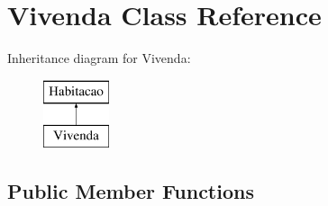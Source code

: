 \hypertarget{class_vivenda}{}\section{Vivenda Class Reference}
\label{class_vivenda}
Inheritance diagram for Vivenda\+:\begin{figure}[H]
\begin{center}
\leavevmode
\includegraphics[height=2.000000cm]{class_vivenda}
\end{center}
\end{figure}
\subsection*{Public Member Functions}
